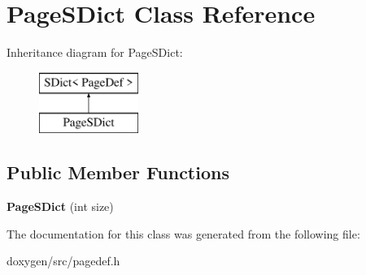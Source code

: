 \hypertarget{class_page_s_dict}{}\section{Page\+S\+Dict Class Reference}
\label{class_page_s_dict}
Inheritance diagram for Page\+S\+Dict\+:\begin{figure}[H]
\begin{center}
\leavevmode
\includegraphics[height=2.000000cm]{class_page_s_dict}
\end{center}
\end{figure}
\subsection*{Public Member Functions}
\begin{DoxyCompactItemize}
\item 
\mbox{\label{class_page_s_dict_ab22010367ff1d002f515743d567a9068}} 
{\bfseries Page\+S\+Dict} (int size)
\end{DoxyCompactItemize}


The documentation for this class was generated from the following file\+:\begin{DoxyCompactItemize}
\item 
doxygen/src/pagedef.\+h\end{DoxyCompactItemize}
